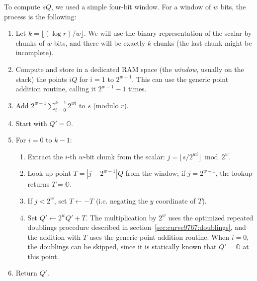 \documentclass{llncs}
\newcommand{\neutral}{\mathbb{O}}
\begin{document}
To compute $sQ$, we used a simple four-bit window. For a window of $w$
bits, the process is the following:
\begin{enumerate}

    \item Let $k = \lfloor (\log r)/w \rfloor$. We will use the binary
    representation of the scalar by chunks of $w$ bits, and there will
    be exactly $k$ chunks (the last chunk might be incomplete).

    \item Compute and store in a dedicated RAM space (the \emph{window},
    usually on the stack) the points $iQ$ for $i = 1$ to $2^{w-1}$.
    This can use the generic point addition routine, calling it
    $2^{w-1}-1$ times.

    \item \label{proc:pointmul:addconst}Add $2^{w-1}\sum_{i=0}^{k-1}
    2^{wi}$ to $s$ (modulo $r$).

    \item Start with $Q' = \neutral$.

    \item For $i = 0$ to $k-1$:
    \begin{enumerate}

        \item Extract the $i$-th $w$-bit chunk from the scalar:
        $j = \lfloor s/2^{wi} \rfloor \bmod 2^w$.

        \item Look up point $T = |j-2^{w-1}|Q$ from the window; if
        $j = 2^{w-1}$, the lookup returns $T = \neutral$.

        \item If $j < 2^w$, set $T \gets -T$ (i.e. negating the $y$
        coordinate of $T$).

        \item Set $Q' \gets 2^w Q' + T$. The multiplication by $2^w$
        uses the optimized repeated doublings procedure described in
        section~\ref{sec:curve9767:doublings}, and the addition with
        $T$ uses the generic point addition routine. When $i = 0$, the
        doublings can be skipped, since it is statically known that
        $Q' = \neutral$ at this point.

    \end{enumerate}

    \item Return $Q'$.

\end{enumerate}
\end{document}
